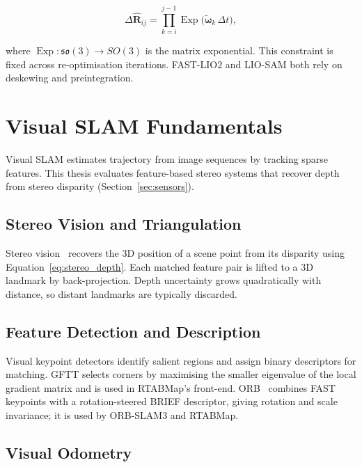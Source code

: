 \begin{equation}
  \Delta\hat{\mathbf{R}}_{ij} =
    \prod_{k=i}^{j-1} \operatorname{Exp}\!\bigl(\tilde{\boldsymbol{\omega}}_k\,\Delta t\bigr),
  \label{eq:imu_preint}
\end{equation}

\noindent where $\operatorname{Exp}: \mathfrak{so}(3) \to SO(3)$ is the matrix
exponential. This constraint is fixed across re-optimisation iterations.
FAST-LIO2 and LIO-SAM both rely on deskewing and preintegration.

\section{Visual SLAM Fundamentals}

Visual SLAM estimates trajectory from image sequences by tracking sparse
features. This thesis evaluates feature-based stereo systems that recover
depth from stereo disparity (Section~\ref{sec:sensors}).

\subsection{Stereo Vision and Triangulation}

Stereo vision~\cite{siegwart2004introduction} recovers the 3D position of a
scene point from its disparity using Equation~\eqref{eq:stereo_depth}.
Each matched feature pair is lifted to a 3D landmark by back-projection.
Depth uncertainty grows quadratically with distance, so distant landmarks are
typically discarded.

\subsection{Feature Detection and Description}

Visual keypoint detectors identify salient regions and assign binary descriptors
for matching.
GFTT selects corners by maximising the smaller eigenvalue of the local gradient
matrix and is used in RTABMap's front-end.
ORB~\cite{rublee2011orb} combines FAST keypoints with a rotation-steered BRIEF
descriptor, giving rotation and scale invariance; it is used by ORB-SLAM3 and
RTABMap.

\subsection{Visual Odometry}

